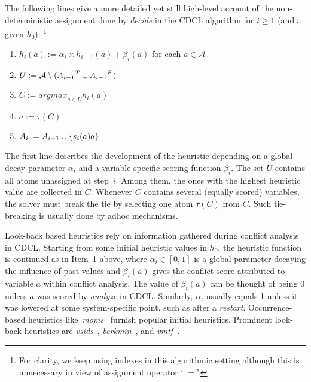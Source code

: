The following lines give a more detailed yet still high-level account of the non-deterministic assignment done by
\emph{decide} in the CDCL algorithm for $i\geq 1$ (and a given $h_0$):%
\footnote{\label{fn:ass}For clarity, we keep using indexes in this algorithmic setting although this is
  unnecessary in view of assignment operator `$:=$'.}
\begin{enumerate}\itemindent 10pt
\item $h_i(a) := \alpha_i\times h_{i-1}(a) + \beta_i(a)$ \hfill for each $a\in\mathcal{A}\qquad$
\item $U:=\mathcal{A}\setminus ({A_{i-1}}^{\boldsymbol{T}}\cup{\ensuremath{A}_{i-1}}^{\boldsymbol{F}})$
\item $C:= \textit{argmax}_{a\in U}h_i(a)$
\item $a:= \tau(C)$
\item $A_i := A_{i-1}\cup\{s_i(a)a\}$
\end{enumerate}
The first line describes the development of the heuristic depending on a global decay parameter
$\alpha_i$ and a variable-specific scoring function $\beta_i$.
The set $U$ contains all atoms unassigned at step~$i$.
Among them, the ones with the highest heuristic value are collected in $C$.
Whenever $C$ contains several (equally scored) variables,
the solver must break the tie by selecting one atom $\tau(C)$ from $C$.
Such tie-breaking is usually done by adhoc mechanisms.

Look-back based heuristics rely on information gathered during conflict analysis in CDCL.
Starting from some initial heuristic values in $h_0$,
the heuristic function is continued as in Item~1 above,
where
$\alpha_i\in{[0,1]}$ is a global parameter decaying the influence of past values
and
$\beta_i(a)$ gives the conflict score attributed to variable $a$ within conflict analysis.
The value of $\beta_i(a)$ can be thought of being 0 unless $a$ was scored by \textit{analyze} in CDCL.
Similarly, $\alpha_i$ usually equals 1 unless it was lowered at some system-specific point, 
such as after a \emph{restart}.
%
Occurrence-based heuristics like~\textit{moms}~\cite{jerwan90aa,pretolani96a} furnish popular initial heuristics.
%
Prominent look-back heuristics are
\textit{vsids}~\cite{momazhzhma01a},
\textit{berkmin}~\cite{golnov02a},
and
\textit{vmtf}~\cite{ryan04a}.


